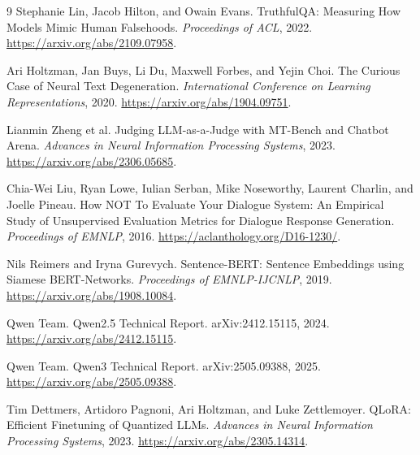 \documentclass[11pt]{article}
\begin{document}
\begin{thebibliography}{9}
Stephanie Lin, Jacob Hilton, and Owain Evans.
\newblock TruthfulQA: Measuring How Models Mimic Human Falsehoods.
\newblock \emph{Proceedings of ACL}, 2022.
\newblock \url{https://arxiv.org/abs/2109.07958}.

Ari Holtzman, Jan Buys, Li Du, Maxwell Forbes, and Yejin Choi.
\newblock The Curious Case of Neural Text Degeneration.
\newblock \emph{International Conference on Learning Representations}, 2020.
\newblock \url{https://arxiv.org/abs/1904.09751}.

Lianmin Zheng et al.
\newblock Judging LLM-as-a-Judge with MT-Bench and Chatbot Arena.
\newblock \emph{Advances in Neural Information Processing Systems}, 2023.
\newblock \url{https://arxiv.org/abs/2306.05685}.

Chia-Wei Liu, Ryan Lowe, Iulian Serban, Mike Noseworthy, Laurent Charlin,
and Joelle Pineau.
\newblock How NOT To Evaluate Your Dialogue System: An Empirical Study of
Unsupervised Evaluation Metrics for Dialogue Response Generation.
\newblock \emph{Proceedings of EMNLP}, 2016.
\newblock \url{https://aclanthology.org/D16-1230/}.

Nils Reimers and Iryna Gurevych.
\newblock Sentence-BERT: Sentence Embeddings using Siamese BERT-Networks.
\newblock \emph{Proceedings of EMNLP-IJCNLP}, 2019.
\newblock \url{https://arxiv.org/abs/1908.10084}.

Qwen Team.
\newblock Qwen2.5 Technical Report.
\newblock arXiv:2412.15115, 2024.
\newblock \url{https://arxiv.org/abs/2412.15115}.

Qwen Team.
\newblock Qwen3 Technical Report.
\newblock arXiv:2505.09388, 2025.
\newblock \url{https://arxiv.org/abs/2505.09388}.

Tim Dettmers, Artidoro Pagnoni, Ari Holtzman, and Luke Zettlemoyer.
\newblock QLoRA: Efficient Finetuning of Quantized LLMs.
\newblock \emph{Advances in Neural Information Processing Systems}, 2023.
\newblock \url{https://arxiv.org/abs/2305.14314}.
\end{thebibliography}
\end{document}
